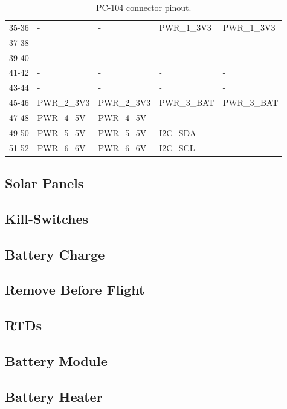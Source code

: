 \begin{table}[!h]
\begin{tabular}{cllll}
        35-36              & -                & -                & PWR\_1\_3V3   & PWR\_1\_3V3   \\
        37-38              & -                & -                & -             & -             \\
        39-40              & -                & -                & -             & -             \\
        41-42              & -                & -                & -             & -             \\
        43-44              & -                & -                & -             & -             \\
        45-46              & PWR\_2\_3V3      & PWR\_2\_3V3      & PWR\_3\_BAT   & PWR\_3\_BAT   \\
        47-48              & PWR\_4\_5V       & PWR\_4\_5V       & -             & -             \\
        49-50              & PWR\_5\_5V       & PWR\_5\_5V       & I2C\_SDA      & -             \\
        51-52              & PWR\_6\_6V       & PWR\_6\_6V       & I2C\_SCL      & -             \\
        \bottomrule[1.5pt]
    \end{tabular}
    \caption{PC-104 connector pinout.}
    \label{tab:pc104-pins}
\end{table}

\subsection{Solar Panels}

\subsection{Kill-Switches}

\subsection{Battery Charge}

\subsection{Remove Before Flight}

\subsection{RTDs}

\subsection{Battery Module}

\subsection{Battery Heater}
